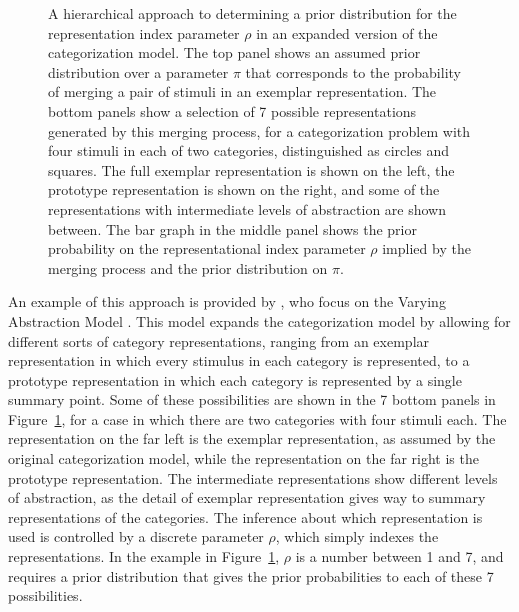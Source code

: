 \begin{figure}[tp]
\begin{center}
\caption{A hierarchical approach to determining a prior distribution for the representation index parameter $\rho$ in an expanded version of the categorization model. The top panel shows an assumed prior distribution over a parameter $\pi$ that corresponds to the probability of merging a pair of stimuli in an exemplar representation. The bottom panels show a selection of 7 possible representations generated by this merging process, for a categorization problem with four stimuli in each of two categories, distinguished as circles and squares. The full exemplar representation is shown on the left, the prototype representation is shown on the right, and some of the representations with intermediate levels of abstraction are shown between. The bar graph in the middle panel shows the prior probability on the representational index parameter $\rho$ implied by the merging process and the prior distribution on $\pi$.}
\label{Hierarchical}
\end{center}
\end{figure}

 An example of this approach is provided by , who focus on the Varying Abstraction Model \cite<VAM:>{VanpaemelStorms2008}. This model expands the categorization model by allowing for different sorts of category representations, ranging from an exemplar representation in which every stimulus in each category is represented, to a prototype representation in which each category is represented by a single summary point. Some of these possibilities are shown in the 7 bottom panels in Figure~\ref{Hierarchical}, for a case in which there are two categories with four stimuli each. The representation on the far left is the exemplar representation, as assumed by the original categorization model, while the representation on the far right is the prototype representation. The intermediate representations show different levels of abstraction, as the detail of exemplar representation gives way to summary representations of the categories. The inference about which representation is used is controlled by a discrete parameter $\rho$, which simply indexes the representations. In the example in Figure~\ref{Hierarchical}, $\rho$ is a number between 1 and 7, and requires a prior distribution that gives the prior probabilities to each of these 7 possibilities.

